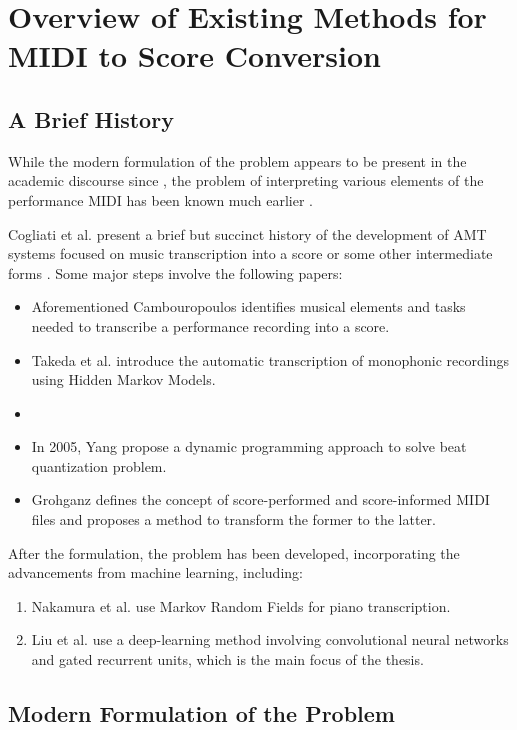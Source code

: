 \chapter{Overview of Existing Methods for MIDI to Score Conversion}

\section{A Brief History}

While the modern formulation of the problem appears to be present in the academic discourse since \cite{Cogliati2016}, the problem of interpreting various elements of the performance MIDI has been known much earlier \cite{Cambouropoulos2000}.

Cogliati et al. present a brief but succinct history of the development of AMT systems focused on music transcription into a score or some other intermediate forms \cite{Cogliati2016}. Some major steps involve the following papers:
\begin{itemize}
	\item Aforementioned Cambouropoulos \cite{Cambouropoulos2000} identifies musical elements and tasks needed to transcribe a performance recording into a score.
	\item Takeda et al. \cite{Takeda2002} introduce the automatic transcription of monophonic recordings using Hidden Markov Models.
	\item 
	\item In 2005, Yang \cite{Yang2005} propose a dynamic programming approach to solve beat quantization problem.
	\item Grohganz \cite{Grohganz2014} defines the concept of score-performed and score-informed MIDI files and proposes a method to transform the former to the latter.
\end{itemize}

After the formulation, the problem has been developed, incorporating the advancements from machine learning, including:
\begin{enumerate}
	\item Nakamura et al. \cite{Nakamura2017} use Markov Random Fields for piano transcription.
	\item Liu et al. \cite{Liu2022} use a deep-learning method involving convolutional neural networks and gated recurrent units, which is the main focus of the thesis.
\end{enumerate}

\section{Modern Formulation of the Problem}

